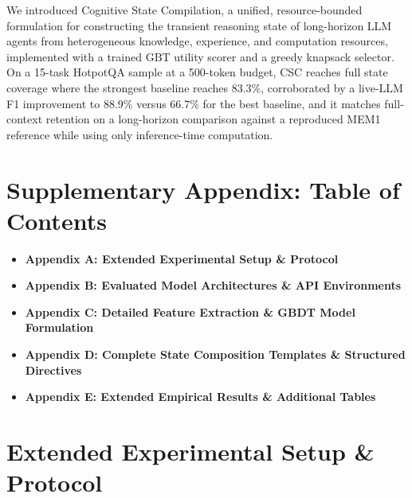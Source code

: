 \documentclass{article}
\begin{document}
We introduced Cognitive State Compilation, a unified, resource-bounded formulation for constructing the transient reasoning state of long-horizon LLM agents from heterogeneous knowledge, experience, and computation resources, implemented with a trained GBT utility scorer and a greedy knapsack selector. On a 15-task HotpotQA sample at a 500-token budget, CSC reaches full state coverage where the strongest baseline reaches 83.3\%, corroborated by a live-LLM F1 improvement to 88.9\% versus 66.7\% for the best baseline, and it matches full-context retention on a long-horizon comparison against a reproduced MEM1 reference while using only inference-time computation.




\clearpage
\appendix

\section*{Supplementary Appendix: Table of Contents}

\begin{itemize}
    \item \textbf{Appendix A: Extended Experimental Setup \& Protocol}
    \item \textbf{Appendix B: Evaluated Model Architectures \& API Environments}
    \item \textbf{Appendix C: Detailed Feature Extraction \& GBDT Model Formulation}
    \item \textbf{Appendix D: Complete State Composition Templates \& Structured Directives}
    \item \textbf{Appendix E: Extended Empirical Results \& Additional Tables}
\end{itemize}

\section{Extended Experimental Setup \& Protocol}
\end{document}
